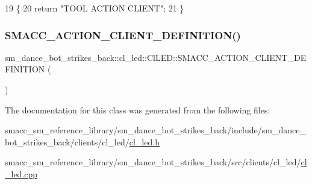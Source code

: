\begin{DoxyCode}
19 \{
20     \textcolor{keywordflow}{return} \textcolor{stringliteral}{"TOOL ACTION CLIENT"};
21 \}
\end{DoxyCode}
\mbox{\label{classsm__dance__bot__strikes__back_1_1cl__led_1_1ClLED_afe42a517e8b1b8e85f071f0fda0fb4d7}} 
\subsubsection{\texorpdfstring{S\+M\+A\+C\+C\+\_\+\+A\+C\+T\+I\+O\+N\+\_\+\+C\+L\+I\+E\+N\+T\+\_\+\+D\+E\+F\+I\+N\+I\+T\+I\+O\+N()}{SMACC\_ACTION\_CLIENT\_DEFINITION()}}
{\footnotesize\ttfamily sm\+\_\+dance\+\_\+bot\+\_\+strikes\+\_\+back\+::cl\+\_\+led\+::\+Cl\+L\+E\+D\+::\+S\+M\+A\+C\+C\+\_\+\+A\+C\+T\+I\+O\+N\+\_\+\+C\+L\+I\+E\+N\+T\+\_\+\+D\+E\+F\+I\+N\+I\+T\+I\+ON (\begin{DoxyParamCaption}\item[{sm\+\_\+dance\+\_\+bot\+\_\+strikes\+\_\+back\+::\+L\+E\+D\+Control\+Action}]{ }\end{DoxyParamCaption})}



The documentation for this class was generated from the following files\+:\begin{DoxyCompactItemize}
\item 
smacc\+\_\+sm\+\_\+reference\+\_\+library/sm\+\_\+dance\+\_\+bot\+\_\+strikes\+\_\+back/include/sm\+\_\+dance\+\_\+bot\+\_\+strikes\+\_\+back/clients/cl\+\_\+led/\hyperlink{strikes__back_2include_2sm__dance__bot__strikes__back_2clients_2cl__led_2cl__led_8h}{cl\+\_\+led.\+h}\item 
smacc\+\_\+sm\+\_\+reference\+\_\+library/sm\+\_\+dance\+\_\+bot\+\_\+strikes\+\_\+back/src/clients/cl\+\_\+led/\hyperlink{strikes__back_2src_2clients_2cl__led_2cl__led_8cpp}{cl\+\_\+led.\+cpp}\end{DoxyCompactItemize}
